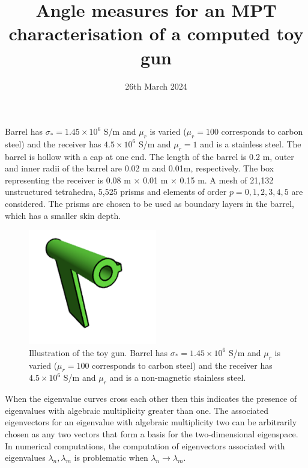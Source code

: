 \documentclass[a4paper,12]{article}
\theoremstyle{definition}
\begin{document}
\title{Angle measures for an MPT characterisation of a computed toy gun}
\date{26th March 2024}
\maketitle

Barrel has $\sigma_* = 1.45\times 10^6$ S/m and $\mu_r$ is varied ($\mu_r=100$ corresponds to carbon steel) and the receiver has $4.5 \times 10^6$ S/m and $\mu_r=1$ and is a stainless steel.  The barrel is hollow with a cap at one end.  The length of the barrel is 0.2 m, outer and inner radii of the barrel are 0.02 m and 0.01m, respectively. The box representing the receiver is 0.08 m $\times$ 0.01 m $\times$ 0.15 m.  A mesh of 21,132 unstructured tetrahedra, 5,525 prisms and elements of order $p=0,1,2,3,4,5$ are considered. The prisms are chosen to be used as boundary layers in the barrel, which has a smaller skin depth. 

\begin{figure}[h]
\begin{center}
\includegraphics[width=0.5\textwidth]{Gun_modelv2_nonsym_StainSt.png}
\end{center}
\caption{Illustration of the toy gun. Barrel has $\sigma_* = 1.45\times 10^6$ S/m and $\mu_r$ is varied ($\mu_r=100$ corresponds to carbon steel) and the receiver has $4.5 \times 10^6$ S/m and $\mu_r$ and is a non-magnetic stainless steel.}
\end{figure}

When the eigenvalue curves  cross each other then this indicates the presence of eigenvalues with algebraic multiplicity greater than one.  The associated eigenvectors for an eigenvalue with algebraic multiplicity two 
 can be arbitrarily chosen as any two vectors that form a basis for the two-dimensional eigenspace.  In numerical computations, the computation of eigenvectors associated with eigenvalues $\lambda_n , \lambda_m$ is problematic when $\lambda_n \to \lambda_m$. 
\end{document}
